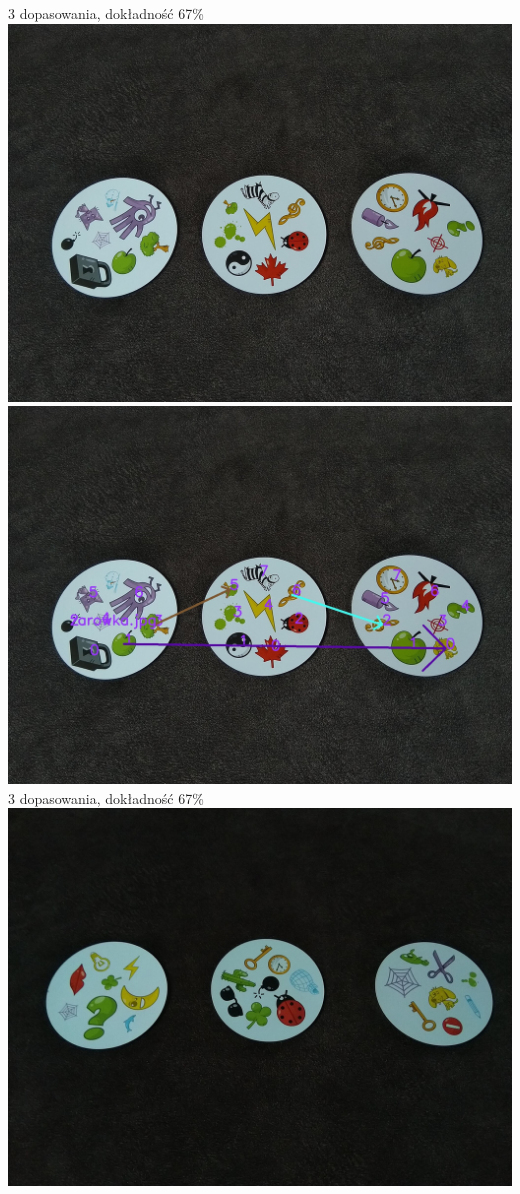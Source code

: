\documentclass[10pt,a4paper]{article}
\begin{document}
\begin{center}
3 dopasowania, dokładność 67\%
\includegraphics[scale=0.28]{medium/dobble06.jpg}
\includegraphics[scale=0.28]{medium/img_arrows1.jpg}\\
3 dopasowania, dokładność 67\%
\includegraphics[scale=0.28]{medium/dobble07.jpg}

\end{center}
\end{document}

